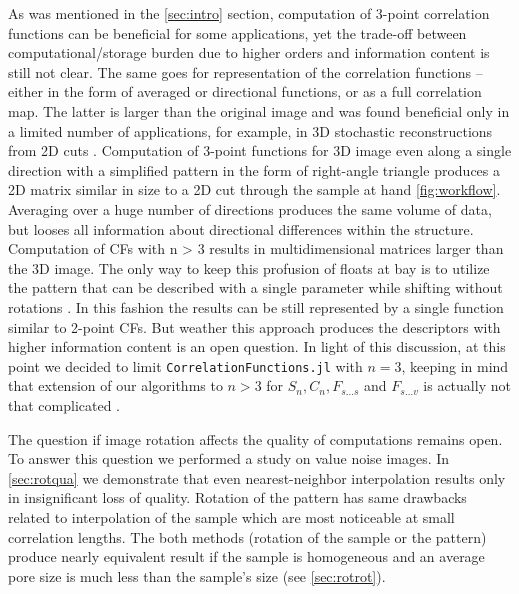 \documentclass[reprint,amsmath,amssymb,aps,pre,showkeys,showpacs]{revtex4-1}
\newcommand{\code}[1]{\colorbox{light-gray}{\texttt{#1}}}
\begin{document}
As was mentioned in the \cref{sec:intro} section, computation of 3-point
correlation functions can be beneficial for some applications, yet the trade-off
between computational/storage burden due to higher orders and information
content is still not clear. The same goes for representation of the correlation
functions -- either in the form of averaged or directional functions, or as a
full correlation map. The latter is larger than the original image and was found
beneficial only in a limited number of applications, for example, in 3D
stochastic reconstructions from 2D cuts
\cite{cherkasov2021adaptive}. Computation of 3-point functions for 3D image even
along a single direction with a simplified pattern in the form of right-angle
triangle produces a 2D matrix similar in size to a 2D cut through the sample at
hand \cref{fig:workflow}. Averaging over a huge number of directions produces
the same volume of data, but looses all information about directional
differences within the structure. Computation of CFs with n > 3 results in
multidimensional matrices larger than the 3D image. The only way to keep this
profusion of floats at bay is to utilize the pattern that can be described with
a single parameter while shifting without rotations
\cite{chen2019hierarchical,chen2022}. In this fashion the results can be still
represented by a single function similar to 2-point CFs. But weather this
approach produces the descriptors with higher information content is an open
question.  In light of this discussion, at this point we decided to limit
\code{CorrelationFunctions.jl} with $n=3$, keeping in mind that extension of our
algorithms to $n>3$ for $S_n, C_n, F_{s...s}$ and $F_{s...v}$ is actually not
that complicated \cite{dimitrakopoulos2010high}.

The question if image rotation affects the quality of computations remains open.
To answer this question we performed a study on value noise images.
In \cref{sec:rotqua} we demonstrate that even nearest-neighbor
interpolation results only in insignificant loss of quality. Rotation of the
pattern has same drawbacks related to interpolation of the sample which are most
noticeable at small correlation lengths. The both methods (rotation of the
sample or the pattern) produce nearly equivalent result if the sample is
homogeneous and an average pore size is much less than the sample's size (see
\cref{sec:rotrot}).
\end{document}
